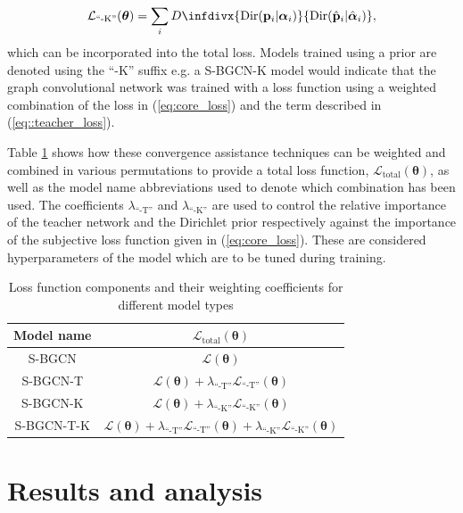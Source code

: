 \documentclass[
twocolumn,
]{ceurart}
\newcommand{\infdiv}{D\infdivx}
\begin{document}
\begin{equation}
    \mathcal{L}_{\text{``-K''}}(\boldsymbol{\theta})=\sum_i\infdiv{\text{Dir}(\mathbf{p}_i\vert\boldsymbol{\alpha}_i)}{\text{Dir}(\hat{\mathbf{p}}_i\vert\hat{\boldsymbol{\alpha}}_i)},
\label{eq::teacher_loss}
\end{equation}
which can be incorporated into the total loss.
Models trained using a prior are denoted using the ``-K'' suffix e.g. a S-BGCN-K model would indicate that the graph convolutional network was trained with a loss function using a weighted combination of the loss in (\ref{eq:core_loss}) and the term described in (\ref{eq::teacher_loss}).

Table \ref{loss_table} shows how these convergence assistance techniques can be weighted and combined in various permutations to provide a total loss function, $\mathcal{L}_\text{total}(\boldsymbol{\theta})$, as well as the model name abbreviations used to denote which combination has been used.
The coefficients $\lambda_{\text{``-T''}}$ and $\lambda_{\text{``-K''}}$ are used to control the relative importance of the teacher network and the Dirichlet prior respectively against the importance of the subjective loss function given in (\ref{eq:core_loss}).
These are considered hyperparameters of the model which are to be tuned during training.

\begin{table}
\renewcommand{\arraystretch}{1.5}
\caption{Loss function components and their weighting coefficients for different model types}
\label{loss_table}
\centering
\begin{tabular}{cc}
\hline
\bfseries Model name & \bfseries $\mathcal{L}_{\text{total}}(\boldsymbol{\theta})$\\
\hline
S-BGCN & $\mathcal{L}(\boldsymbol{\theta})$ \\
S-BGCN-T & $\mathcal{L}(\boldsymbol{\theta})+\lambda_{\text{``-T''}}\mathcal{L}_{\text{``-T''}}(\boldsymbol{\theta})$ \\
S-BGCN-K & $\mathcal{L}(\boldsymbol{\theta})+\lambda_{\text{``-K''}}\mathcal{L}_{\text{``-K''}}(\boldsymbol{\theta})$ \\
S-BGCN-T-K & $\mathcal{L}(\boldsymbol{\theta})+\lambda_{\text{``-T''}}\mathcal{L}_{\text{``-T''}}(\boldsymbol{\theta})+\lambda_{\text{``-K''}}\mathcal{L}_{\text{``-K''}}(\boldsymbol{\theta})$ \\
\hline
\end{tabular}
\end{table}

\section{Results and analysis}
\label{sec::results}
\end{document}
